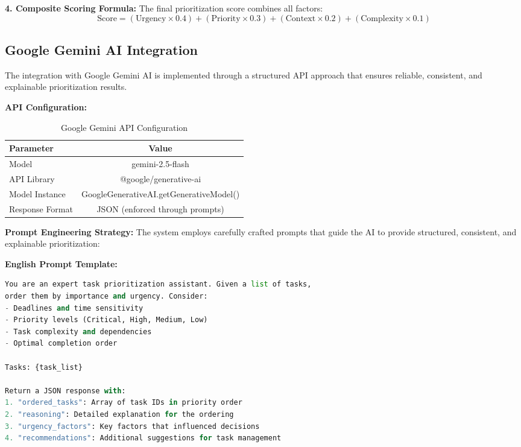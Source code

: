 \textbf{4. Composite Scoring Formula:}
The final prioritization score combines all factors:
\[
\text{Score} = (\text{Urgency} \times 0.4) + (\text{Priority} \times 0.3) + (\text{Context} \times 0.2) + (\text{Complexity} \times 0.1)
\]

\subsection{Google Gemini AI Integration}

The integration with Google Gemini AI is implemented through a structured API approach that ensures reliable, consistent, and explainable prioritization results.

\textbf{API Configuration:}
\begin{table}[H]
\centering
\begin{tabular}{|l|c|}
\hline
\textbf{Parameter} & \textbf{Value} \\
\hline
Model & gemini-2.5-flash \\
\hline
API Library & @google/generative-ai \\
\hline
Model Instance & GoogleGenerativeAI.getGenerativeModel() \\
\hline
Response Format & JSON (enforced through prompts) \\
\hline
\end{tabular}
\caption{Google Gemini API Configuration}
\end{table}

\textbf{Prompt Engineering Strategy:}
The system employs carefully crafted prompts that guide the AI to provide structured, consistent, and explainable prioritization:

\textbf{English Prompt Template:}
\begin{lstlisting}[language=Python, caption=English Prioritization Prompt Template]
You are an expert task prioritization assistant. Given a list of tasks, 
order them by importance and urgency. Consider:
- Deadlines and time sensitivity
- Priority levels (Critical, High, Medium, Low)
- Task complexity and dependencies
- Optimal completion order

Tasks: {task_list}

Return a JSON response with:
1. "ordered_tasks": Array of task IDs in priority order
2. "reasoning": Detailed explanation for the ordering
3. "urgency_factors": Key factors that influenced decisions
4. "recommendations": Additional suggestions for task management
\end{lstlisting}

